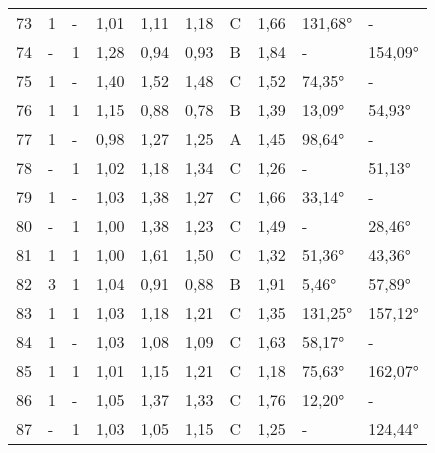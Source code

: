 \begin{longtable}{p{0.7cm}p{1.4cm}p{1.4cm}p{1cm}p{1cm}p{1cm}p{1cm}p{1cm}p{1cm}p{1cm}}
\small{73} & \small{1} & \small{-} & \small{1,01} & \small{1,11} & \small{1,18} & \small{C} & \small{1,66} & \small{131,68°} & \small{-}\\
\small{74} & \small{-} & \small{1} & \small{1,28} & \small{0,94} & \small{0,93} & \small{B} & \small{1,84} & \small{-} & \small{154,09°}\\
\small{75} & \small{1} & \small{-} & \small{1,40} & \small{1,52} & \small{1,48} & \small{C} & \small{1,52} & \small{74,35°} & \small{-}\\
\small{76} & \small{1} & \small{1} & \small{1,15} & \small{0,88} & \small{0,78} & \small{B} & \small{1,39} & \small{13,09°} & \small{54,93°}\\
\small{77} & \small{1} & \small{-} & \small{0,98} & \small{1,27} & \small{1,25} & \small{A} & \small{1,45} & \small{98,64°} & \small{-}\\
\small{78} & \small{-} & \small{1} & \small{1,02} & \small{1,18} & \small{1,34} & \small{C} & \small{1,26} & \small{-} & \small{51,13°}\\
\small{79} & \small{1} & \small{-} & \small{1,03} & \small{1,38} & \small{1,27} & \small{C} & \small{1,66} & \small{33,14°} & \small{-}\\
\small{80} & \small{-} & \small{1} & \small{1,00} & \small{1,38} & \small{1,23} & \small{C} & \small{1,49} & \small{-} & \small{28,46°}\\
\small{81} & \small{1} & \small{1} & \small{1,00} & \small{1,61} & \small{1,50} & \small{C} & \small{1,32} & \small{51,36°} & \small{43,36°}\\
\small{82} & \small{3} & \small{1} & \small{1,04} & \small{0,91} & \small{0,88} & \small{B} & \small{1,91} & \small{5,46°} & \small{57,89°}\\
\small{83} & \small{1} & \small{1} & \small{1,03} & \small{1,18} & \small{1,21} & \small{C} & \small{1,35} & \small{131,25°} & \small{157,12°}\\
\small{84} & \small{1} & \small{-} & \small{1,03} & \small{1,08} & \small{1,09} & \small{C} & \small{1,63} & \small{58,17°} & \small{-}\\
\small{85} & \small{1} & \small{1} & \small{1,01} & \small{1,15} & \small{1,21} & \small{C} & \small{1,18} & \small{75,63°} & \small{162,07°}\\
\small{86} & \small{1} & \small{-} & \small{1,05} & \small{1,37} & \small{1,33} & \small{C} & \small{1,76} & \small{12,20°} & \small{-}\\
\small{87} & \small{-} & \small{1} & \small{1,03} & \small{1,05} & \small{1,15} & \small{C} & \small{1,25} & \small{-} & \small{124,44°}\\

\end{longtable}
